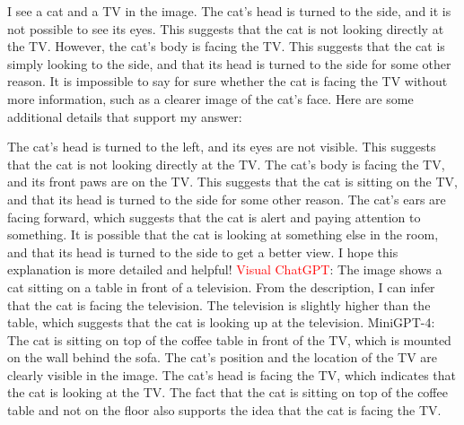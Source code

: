 \begin{enumerate}
    I see a cat and a TV in the image.
    The cat's head is turned to the side, and it is not possible to see its eyes. This suggests that the cat is not looking directly at the TV.
    However, the cat's body is facing the TV. This suggests that the cat is simply looking to the side, and that its head is turned to the side for some other reason.
    It is impossible to say for sure whether the cat is facing the TV without more information, such as a clearer image of the cat's face.
    Here are some additional details that support my answer:
    
    The cat's head is turned to the left, and its eyes are not visible. This suggests that the cat is not looking directly at the TV.
    The cat's body is facing the TV, and its front paws are on the TV. This suggests that the cat is sitting on the TV, and that its head is turned to the side for some other reason.
    The cat's ears are facing forward, which suggests that the cat is alert and paying attention to something. It is possible that the cat is looking at something else in the room, and that its head is turned to the side to get a better view.
    I hope this explanation is more detailed and helpful!
    \subitem \textcolor{red}{Visual ChatGPT}: The image shows a cat sitting on a table in front of a television. From the description, I can infer that the cat is facing the television. The television is slightly higher than the table, which suggests that the cat is looking up at the television.
    \subitem MiniGPT-4: The cat is sitting on top of the coffee table in front of the TV, which is mounted on the wall behind the sofa. The cat’s position and the location of the TV are clearly visible in the image. The cat’s head is facing the TV, which indicates that the cat is looking at the TV. The fact that the cat is sitting on top of the coffee table and not on the floor also supports the idea that the cat is facing the TV.
\end{enumerate}
